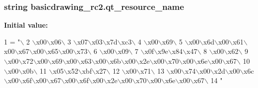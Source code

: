 \subsubsection[{qt\+\_\+resource\+\_\+name}]{\setlength{\rightskip}{0pt plus 5cm}string basicdrawing\+\_\+rc2.\+qt\+\_\+resource\+\_\+name}\label{namespacebasicdrawing__rc2_ac0514aa92d2cba41e23d58741fe8fdd0}
{\bfseries Initial value\+:}
\begin{DoxyCode}
1 = \textcolor{stringliteral}{"\(\backslash\)}
2 \textcolor{stringliteral}{\(\backslash\)x00\(\backslash\)x06\(\backslash\)}
3 \textcolor{stringliteral}{\(\backslash\)x07\(\backslash\)x03\(\backslash\)x7d\(\backslash\)xc3\(\backslash\)}
4 \textcolor{stringliteral}{\(\backslash\)x00\(\backslash\)x69\(\backslash\)}
5 \textcolor{stringliteral}{\(\backslash\)x00\(\backslash\)x6d\(\backslash\)x00\(\backslash\)x61\(\backslash\)x00\(\backslash\)x67\(\backslash\)x00\(\backslash\)x65\(\backslash\)x00\(\backslash\)x73\(\backslash\)}
6 \textcolor{stringliteral}{\(\backslash\)x00\(\backslash\)x09\(\backslash\)}
7 \textcolor{stringliteral}{\(\backslash\)x0f\(\backslash\)x9e\(\backslash\)x84\(\backslash\)x47\(\backslash\)}
8 \textcolor{stringliteral}{\(\backslash\)x00\(\backslash\)x62\(\backslash\)}
9 \textcolor{stringliteral}{\(\backslash\)x00\(\backslash\)x72\(\backslash\)x00\(\backslash\)x69\(\backslash\)x00\(\backslash\)x63\(\backslash\)x00\(\backslash\)x6b\(\backslash\)x00\(\backslash\)x2e\(\backslash\)x00\(\backslash\)x70\(\backslash\)x00\(\backslash\)x6e\(\backslash\)x00\(\backslash\)x67\(\backslash\)}
10 \textcolor{stringliteral}{\(\backslash\)x00\(\backslash\)x0b\(\backslash\)}
11 \textcolor{stringliteral}{\(\backslash\)x05\(\backslash\)x52\(\backslash\)xbf\(\backslash\)x27\(\backslash\)}
12 \textcolor{stringliteral}{\(\backslash\)x00\(\backslash\)x71\(\backslash\)}
13 \textcolor{stringliteral}{\(\backslash\)x00\(\backslash\)x74\(\backslash\)x00\(\backslash\)x2d\(\backslash\)x00\(\backslash\)x6c\(\backslash\)x00\(\backslash\)x6f\(\backslash\)x00\(\backslash\)x67\(\backslash\)x00\(\backslash\)x6f\(\backslash\)x00\(\backslash\)x2e\(\backslash\)x00\(\backslash\)x70\(\backslash\)x00\(\backslash\)x6e\(\backslash\)x00\(\backslash\)x67\(\backslash\)}
14 \textcolor{stringliteral}{"}
\end{DoxyCode}
\hypertarget{namespacebasicdrawing__rc2_aa80e512d96340c796e6fe2b65727ae11}{}
